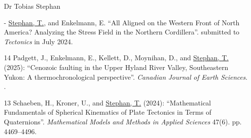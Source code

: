 \documentclass[10pt, paper=letter]{scrartcl} %
\begin{document}
\begin{cv}{\textsf{Dr Tobias Stephan}}
\begin{cvlist}{}
        \item[-] \ul{Stephan, T.}, and Enkelmann, E. \enquote{All Aligned on the Western Front of North America? Analyzing the Stress Field in the Northern Cordillera}. submitted to \textit{Tectonics} in July 2024.

        \item[14] Padgett, J., Enkelmann, E., Kellett, D., Moynihan, D., and \ul{Stephan, T.} (2025): \enquote{Cenozoic faulting in the Upper Hyland River Valley, Southeastern Yukon: A thermochronological perspective}. \textit{Canadian Journal of Earth Sciences}. .
        
        \item[13] Schaeben, H., Kroner, U., and \ul{Stephan, T.} (2024): \enquote{Mathematical Fundamentals of Spherical Kinematics of Plate Tectonics in Terms of Quaternions}. \textit{Mathematical Models and Methods in Applied Sciences} 47(6). pp. 4469--4496. 


\end{cvlist}
\end{cv}
\end{document}
